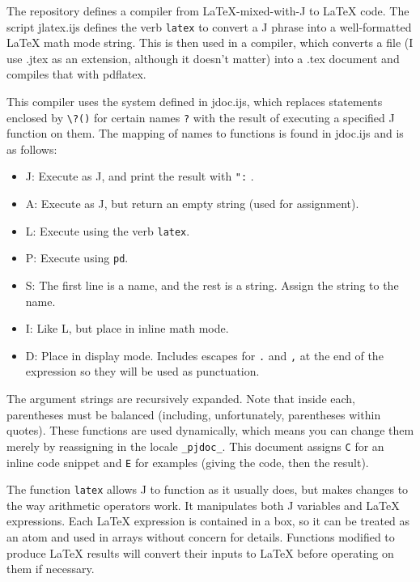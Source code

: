 \documentclass{article}
\begin{document}
The repository defines a compiler from LaTeX-mixed-with-J to LaTeX code.
The script jlatex.ijs defines the verb \lstinline`latex` to convert a J phrase
into a well-formatted LaTeX math mode string.  This is then used in a
compiler, which converts a file (I use .jtex as an extension, although
it doesn't matter) into a .tex document and compiles that with pdflatex.

This compiler uses the system defined in jdoc.ijs, which replaces
statements enclosed by \lstinline`\?()` for certain names \lstinline`?` with the result of
executing a specified J function on them. The mapping of names to
functions is found in jdoc.ijs and is as follows:
\begin{itemize}
  \item J: Execute as J, and print the result with \lstinline`":` .
  \item A: Execute as J, but return an empty string (used for assignment).
  \item L: Execute using the verb \lstinline`latex`.
  \item P: Execute using \lstinline`pd`.
  \item S: The first line is a name, and the rest is a string. Assign the
           string to the name.
  \item I: Like L, but place in inline math mode.
  \item D: Place in display mode. Includes escapes for \lstinline`.` and \lstinline`,` at
           the end of the expression so they will be used as punctuation.
\end{itemize}
The argument strings are recursively expanded. Note that inside each,
parentheses must be balanced (including, unfortunately, parentheses
within quotes).
These functions are used dynamically, which means you can change them
merely by reassigning in the locale \lstinline`_pjdoc_`. This document assigns
\lstinline`C` for an inline code snippet and \lstinline`E` for examples (giving the code,
then the result).

The function \lstinline`latex` allows J to function as it usually does, but
makes changes to the way arithmetic operators work.
It manipulates both J variables and LaTeX expressions.
Each LaTeX expression is contained in a box, so it can be treated as
an atom and used in arrays without concern for details.
Functions modified to produce LaTeX results will convert their inputs
to LaTeX before operating on them if necessary.
\end{document}

